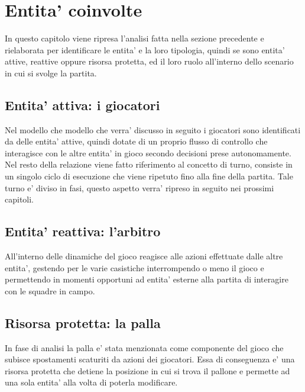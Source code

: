 \section*{Entita' coinvolte}

In questo capitolo viene ripresa l’analisi fatta nella sezione precedente e rielaborata per identificare le entita’ e la loro tipologia, quindi se sono entita’ attive, reattive oppure risorsa protetta, ed il loro ruolo all’interno dello scenario in cui si svolge la partita. 

\subsection*{Entita’ attiva: i giocatori}
%
\label{sec:entita_giocatori}

Nel modello che modello che verra’ discusso in seguito i giocatori sono identificati da delle entita’ attive, quindi dotate di un proprio flusso di controllo che interagisce con le altre entita’ in gioco secondo decisioni prese autonomamente. Nel resto della relazione viene fatto riferimento al concetto di turno, consiste in un singolo ciclo di esecuzione che viene ripetuto fino alla fine della partita. Tale turno e’ diviso in fasi, questo aspetto verra’ ripreso in seguito nei prossimi capitoli.

\subsection*{Entita’ reattiva: l'arbitro}
%
\label{sec:entita_abitro}

All’interno delle dinamiche del gioco reagisce alle azioni effettuate dalle altre entita’, gestendo per le varie casistiche interrompendo o meno il gioco e permettendo in momenti opportuni ad entita’ esterne alla partita di interagire con le squadre in campo.

\subsection*{Risorsa protetta: la palla}
%
\label{sec:entita_palla}

In fase di analisi la palla e’ stata menzionata come componente del gioco che subisce spostamenti scaturiti da azioni dei giocatori. Essa di conseguenza e’ una risorsa protetta che detiene la posizione in cui si trova il pallone e permette ad una sola entita’ alla volta di poterla modificare.

